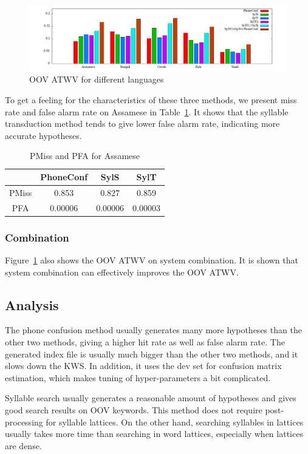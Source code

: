 \documentclass[journal]{IEEEtran}
\begin{document}
\begin{figure}[!t]
  \centering
  \includegraphics[width=1.00\textwidth, height=0.25\textwidth]{histall.png}
  \caption{OOV ATWV for different languages}
  \label{fig:atwvoov}
\end{figure}

To get a feeling for the characteristics of these three methods, we present miss rate and false alarm rate on Assamese
in Table~\ref{tab:Miss}. It shows that the syllable transduction method tends to give lower false alarm rate, indicating
more accurate hypotheses.
\begin{table}[!t]
  \caption{PMiss and PFA for Assamese}
  \label{tab:Miss}
  \centering
  \begin{tabular}{cccc}
    \hline
              & PhoneConf & SylS  & SylT  \\
    \hline
    PMiss     & 0.853     & 0.827 & 0.859 \\
    PFA       & 0.00006   & 0.00006 & 0.00003 \\
    \hline
  \end{tabular}
\end{table}

\subsubsection{Combination}
Figure~\ref{fig:atwvoov} also shows the OOV ATWV on system combination. It is shown that system combination can effectively
improves the OOV ATWV.

\subsection{Analysis}
The phone confusion method usually generates many more hypotheses than the other two methods, giving a higher hit rate as well as
false alarm rate. The generated index file is usually much bigger than the other two methods, and it slows down the KWS. 
In addition, it uses the dev set for confusion matrix estimation, which makes tuning of hyper-parameters a bit complicated.

Syllable search usually generates a reasonable amount of hypotheses and gives good search results on OOV keywords. This
method does not require post-processing for syllable lattices. On the other hand, searching syllables in lattices 
usually takes more time than searching in word lattices, especially when lattices are dense.
\end{document}

